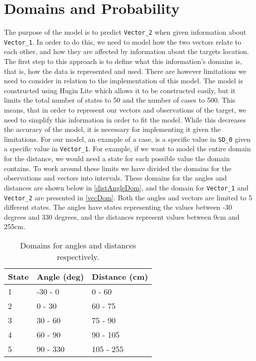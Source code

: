 \section{Domains and Probability}\label{MID}
The purpose of the model is to predict \texttt{Vector\_2} when given information
about \texttt{Vector\_1}. In order to do this, we need to model how the two
vectors relate to each other, and how they are affected by information about the
targets location. The first step to this approach is to define what this
information's domains is, that is, how the data is represented and used.
There are however limitations we need to consider in relation to the
implementation of this model. The model is constructed using Hugin Lite
\citep{Hugin} which allows it to be constructed easily, but it limits the total
number of states to 50 and the number of cases to 500. This means, that in order
to represent our vectors and observations of the target, we need to simplify
this information in order to fit the model. While this decreases the accuracy of
the model, it is necessary for implementing it given the limitations. For our
model, an example of a case, is a specific value in \texttt{SD\_0} given a
specific value in \texttt{Vector\_1}. For example, if we want to model the
entire domain for the distance, we would need a state for each possible value
the domain contains. To work around these limits we have divided the domains
for the observations and vectors into intervals. These domains for the angles
and distances are shown below in \autoref{distAngleDom}, and the domain for
\texttt{Vector\_1} and \texttt{Vector\_2} are presented in \autoref{vecDom}.
Both the angles and vectors are limited to 5 different states. The angles have
states representing the values between -30 degrees and 330 degrees, and the
distances represent values between 0cm and 255cm.

\begin{table}[H]
\centering
\begin{tabular}{l|l|l}
State & Angle (deg) & Distance (cm) \\ \hline
1     & -30 - 0     & 0 - 60        \\
2     & 0 - 30      & 60 - 75       \\
3     & 30 - 60     & 75 - 90       \\
4     & 60 - 90     & 90 - 105      \\
5     & 90 - 330    & 105 - 255     
\end{tabular}
\caption{Domains for angles and distances respectively.}
\label{distAngleDom}
\end{table}

